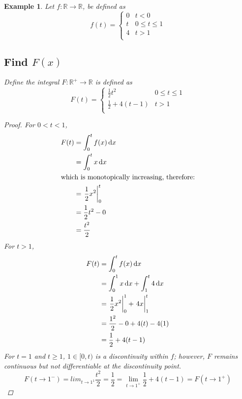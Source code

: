 \documentclass[]{article}
\newcommand{\R}{\mathbb{R}}
\newtheorem{example}{Example}
\begin{document}
\begin{example}
    Let $f : \R \to \R$, be defined as\[
        f(t) = \begin{cases}
            0 &t<0\\
            t &0 \leq t \leq 1\\
            4 &t>1\\
        \end{cases} 
    \]
    \subsection{Find $F(x)$}
    Define the integral $F: \R^{+} \to \R$ is defined as\[
        \boxed{F(t) = \begin{cases}
            \frac{1}{2} t^2 &0 \leq t \leq 1\\
            \frac{1}{2} + 4 (t - 1) &t>1\\
        \end{cases}}
    \]
    \begin{proof}
        For $0<t<1$,
        \begin{align*}
            F(t) &= \int_{0}^{t} f(x) \dd{x}\\
                &= \int_{0}^{t} x \dd{x}\\
            \intertext{which is monotopically increasing, therefore:}
                &= \eval{\frac{1}{2} x^2}_{0}^{t}\\
                &= \frac{1}{2} t^2 - 0\\
                &= \frac{t^2}{2}
        \end{align*}
        For $t>1$,
        \begin{align*}
            F(t) &= \int_{0}^{t} f(x) \dd{x}\\
                &= \int_{0}^{1} x \dd{x} + \int_{1}^{t} 4 \dd{x}\\
                &= \eval{\frac{1}{2} x^2}_{0}^{1} + \eval{4 x}_{1}^{t}\\
                &= \frac{1^2}{2} - 0 + 4(t) - 4(1)\\
                &= \frac{1}{2} + 4(t - 1)
        \end{align*}
        For $t=1$ and $t\geq 1$, $1\in [0,t)$ is a discontinuity within $f$; 
        however, $F$ remains continuous but not differentiable at the discontinuity point.\[
            F(t \to 1^{-}) = lim_{t\to 1^{1}} \frac{t^2}{2} = \frac{1}{2} = \lim_{t\to1^{+}} \frac{1}{2} + 4(t-1) = F(t \to 1^{+})
        \] %
    \end{proof}

\end{example}
\end{document}
